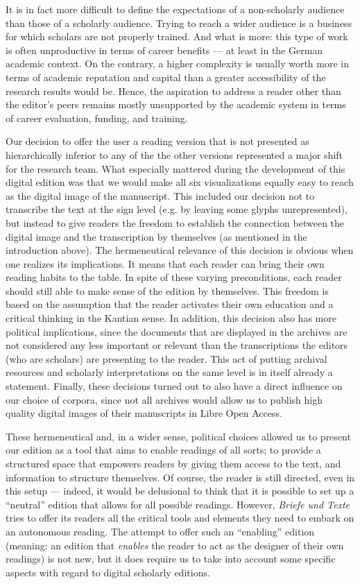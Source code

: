 \begin{paper}
It is in fact more difficult to define the expectations of a
non-scholarly audience than those of a scholarly audience. Trying to
reach a wider audience is a business for which scholars are not properly
trained. And what is more: this type of work is often unproductive in
terms of career benefits --- at least in the German academic context. On the
contrary, a higher complexity is usually worth more in terms of academic
reputation and capital than a greater accessibility of the
research results would be. Hence, the aspiration to address a reader other   than
the editor's peers remains mostly unsupported by the academic system in
terms of career evaluation, funding, and training.

Our decision to offer the user a reading version that is not presented as hierarchically
inferior to any of the the other versions represented a major shift for the research team. What especially
mattered during the development of this
digital edition was that we would make all six visualizations
equally easy to reach as the digital image of the manuscript. This included our decision not to transcribe the text at the sign level (e.g. by leaving some
glyphs unrepresented), but instead to give readers the freedom
to establish the connection between the digital image and the
transcription by themselves (as mentioned in the introduction above). The
hermeneutical relevance of this decision is obvious when one realizes
its implications. It means that each reader can bring their own
reading habits to the table. In spite of these varying preconditions, each reader
should still able to make sense of the edition by themselves. This
freedom is based on the assumption that the reader activates their own education and a
critical thinking in the Kantian sense. In addition,  this decision also has more political implications,
since the documents that are displayed in the archives are not
considered any less important or relevant than the transcriptions 
the editors (who are scholars) are presenting to the reader. This act of putting
archival resources and scholarly interpretations on the same level is in
itself already a statement. Finally, these decisions turned out to also have a direct influence on
our choice of corpora, since not all archives would allow us to publish
high quality digital images of their manuscripts in Libre Open Access.

These hermeneutical and, in a wider sense, political choices allowed us to present our edition as a tool that aims to
enable readings of all sorts; to provide a structured space that empowers readers by giving them access to the text, and information to structure themselves. Of
course, the reader is still directed, even in this setup --- indeed, it would be delusional to think that it is possible to set up a ``neutral'' edition that allows for all possible readings. However, \emph{Briefe und Texte} tries to offer its
readers all the critical tools and elements they need to embark on an autonomous reading.
The attempt to offer such an ``enabling'' edition (meaning: an edition that \emph{enables} the reader
to act as the designer of their own readings) is not new, but it does
require us to take into account some specific aspects with regard to digital
scholarly editions.


\end{paper}
